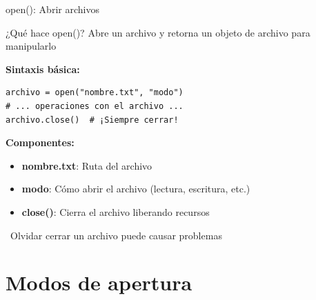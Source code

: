\documentclass{beamer}
\begin{document}
\begin{frame}[fragile]{open(): Abrir archivos \faFolderOpen}
\begin{conceptbox}{¿Qué hace open()?}
Abre un archivo y retorna un objeto de archivo para manipularlo
\end{conceptbox}

\textbf{Sintaxis básica:}
\begin{lstlisting}
archivo = open("nombre.txt", "modo")
# ... operaciones con el archivo ...
archivo.close()  # ¡Siempre cerrar!
\end{lstlisting}

\vspace{0.2cm}
\textbf{Componentes:}
\small
\begin{itemize}
    \item[\faFile] \textbf{nombre.txt}: Ruta del archivo
    \item[\faKey] \textbf{modo}: Cómo abrir el archivo (lectura, escritura, etc.)
    \item[\faTimes] \textbf{close()}: Cierra el archivo liberando recursos
\end{itemize}

\vspace{-0.1cm}
\begin{notebox}
\small\faExclamationTriangle\ Olvidar cerrar un archivo puede causar problemas
\end{notebox}
\end{frame}

\section{Modos de apertura}
\end{document}
